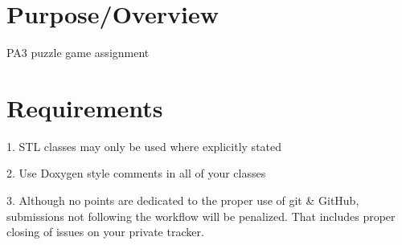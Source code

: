 \hypertarget{index_purpose}{}\section{\-Purpose/\-Overview}\label{index_purpose}
\-P\-A3 puzzle game assignment \hypertarget{index_requirements}{}\section{\-Requirements}\label{index_requirements}
1. \-S\-T\-L classes may only be used where explicitly stated \par
 2. \-Use \-Doxygen style comments in all of your classes \par
 3. \-Although no points are dedicated to the proper use of git \& \-Git\-Hub, submissions not following the workflow will be penalized. \-That includes proper closing of issues on your private tracker. 